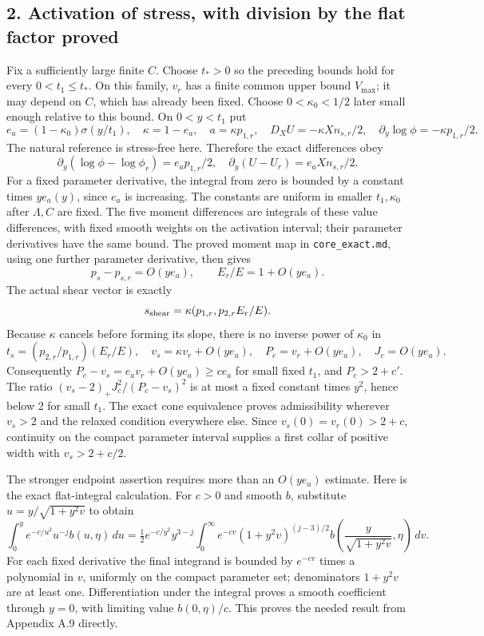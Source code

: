 \documentclass[10pt,a4paper]{article}
\begin{document}
\subsection{2. Activation of stress, with division by the flat factor proved}

Fix a sufficiently large finite \(C\). Choose \(t_*>0\) so the preceding bounds hold for every \(0<t_1\le t_*\). On this family, \(v_r\) has a finite common upper bound \(V_{\max}\); it may depend on \(C\), which has already been fixed. Choose \(0<\kappa_0<1/2\) later small enough relative to this bound. On \(0<y<t_1\) put
\[
e_a=(1-\kappa_0)\sigma(y/t_1),\quad\kappa=1-e_a,
\quad a=\kappa p_{1,r},\quad D_XU=-\kappa Xn_{s,r}/2,
\quad \partial_y\log\phi=-\kappa p_{1,r}/2.
\]
The natural reference is stress-free here. Therefore the exact differences obey
\[
\partial_y(\log\phi-\log\phi_r)=e_ap_{1,r}/2,
\quad \partial_y(U-U_r)=e_aXn_{s,r}/2.
\]
For a fixed parameter derivative, the integral from zero is bounded by a constant times \(ye_a(y)\), since \(e_a\) is increasing. The constants are uniform in smaller \(t_1,\kappa_0\) after \(\Lambda,C\) are fixed. The five moment differences are integrals of these value differences, with fixed smooth weights on the activation interval; their parameter derivatives have the same bound. The proved moment map in \texttt{core\_exact.md}, using one further parameter derivative, then gives
\[
p_s-p_{s,r}=O(ye_a),\qquad E_r/E=1+O(ye_a).
\]
The actual shear vector is exactly
\[
s_{\rm shear}=\kappa(p_{1,r},p_{2,r}E_r/E).
\]
Because \(\kappa\) cancels before forming its slope, there is no inverse power of \(\kappa_0\) in
\[
t_s=(p_{2,r}/p_{1,r})(E_r/E),\quad
v_s=\kappa v_r+O(ye_a),\quad P_c=v_r+O(ye_a),\quad J_c=O(ye_a).
\]
Consequently \(P_c-v_s=e_av_r+O(ye_a)\ge ce_a\) for small fixed \(t_1\), and \(P_c>2+c'\). The ratio
\((v_s-2)_+J_c^2/(P_c-v_s)^2\) is at most a fixed constant times \(y^2\), hence below 2 for small \(t_1\). The exact cone equivalence proves admissibility wherever \(v_s>2\) and the relaxed condition everywhere else. Since \(v_s(0)=v_r(0)>2+c\), continuity on the compact parameter interval supplies a first collar of positive width with \(v_s>2+c/2\).

The stronger endpoint assertion requires more than an \(O(ye_a)\) estimate. Here is the exact flat-integral calculation. For \(c>0\) and smooth \(b\), substitute \(u=y/\sqrt{1+y^2v}\) to obtain
\[
\int_0^y e^{-c/u^2}u^{-j}b(u,\eta)\,du
=\tfrac12e^{-c/y^2}y^{3-j}
\int_0^\infty e^{-cv}(1+y^2v)^{(j-3)/2}
b\left(\frac y{\sqrt{1+y^2v}},\eta\right)\,dv.
\]
For each fixed derivative the final integrand is bounded by \(e^{-cv}\) times a polynomial in \(v\), uniformly on the compact parameter set; denominators \(1+y^2v\) are at least one. Differentiation under the integral proves a smooth coefficient through \(y=0\), with limiting value \(b(0,\eta)/c\). This proves the needed result from Appendix A.9 directly.
\end{document}
